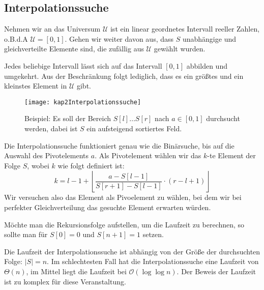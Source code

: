 \subsection{Interpolationssuche}
Nehmen wir an das Universum $\mathcal{U}$ ist ein linear geordnetes Intervall reeller Zahlen, o.B.d.A $\mathcal{U}=[0,1]$. Gehen wir weiter davon aus, dass $S$ unabhängige und gleichverteilte Elemente sind, die zufällig aus $\mathcal{U}$ gewählt wurden.

\begin{Bem}
\hspace{\parindent}Jedes beliebige Intervall lässt sich auf das Intervall $[0,1]$ abbilden und umgekehrt. Aus der Beschränkung folgt lediglich, dass es ein größtes und ein kleinstes Element in $\mathcal{U}$ gibt.\end{Bem}

\begin{figure}[htb]
  \centering
  \texttt{[image: kap2Interpolationssuche]}
  \caption{Beispiel: Es soll der Bereich $S[l] \ldots S[r]$ nach $a \in [0,1]$ durchsucht werden, dabei ist $S$ ein aufsteigend sortiertes Feld.}
  \label{interpolationssuche}
\end{figure}

Die Interpolationssuche funktioniert genau wie die Binärsuche, bis auf die Auswahl des Pivotelements $a$. Als Pivotelement wählen wir das $k$-te Element der Folge $S$, wobei $k$ wie folgt definiert ist:
\[ k=l-1 + \left\lfloor \frac{a-S[l-1]}{S[r+1]-S[l-1]} \cdot (r-l+1) \right\rfloor \]
Wir versuchen also das Element als Pivoelement zu wählen, bei dem wir bei perfekter Gleichverteilung das gesuchte Element erwarten würden.



Möchte man die Rekursionsfolge aufstellen, um die Laufzeit zu berechnen, so sollte man für $S[0] = 0$ und $S[n+1] = 1$ setzen.

Die Laufzeit der Interpolationssuche ist abhängig von der Größe der durchsuchten Folge: $|S|=n$. Im schlechtesten Fall hat die Interpolationssuche eine Laufzeit von $\Theta(n)$, im Mittel liegt die Laufzeit bei $\mathcal{O}(\log\log n)$. Der Beweis der Laufzeit ist zu komplex für diese Veranstaltung.

